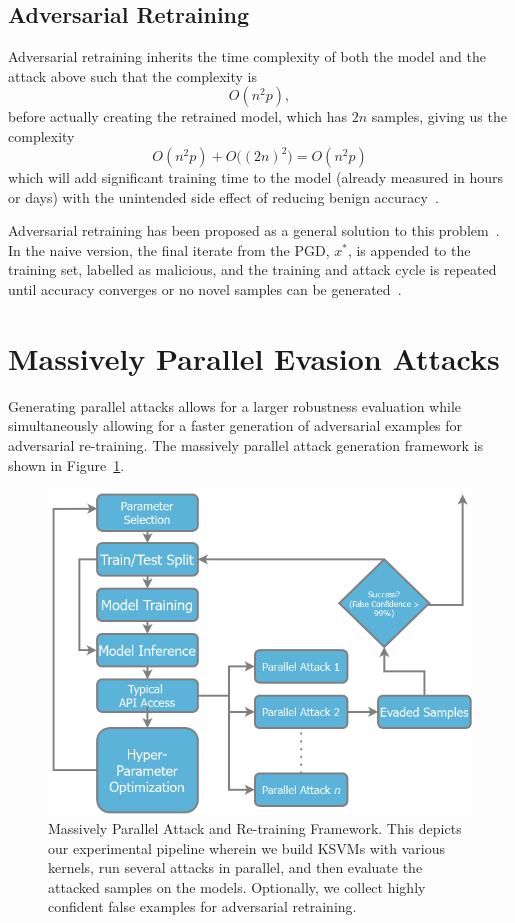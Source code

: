 \documentclass[fonts]{icst}
\begin{document}
\subsection{Adversarial Retraining}
\label{retrain}
Adversarial retraining inherits the time complexity of both the model and the attack above such that the complexity is
$$
    O(n^2p),
$$
before actually creating the retrained model, which has $2n$ samples, giving us the complexity
$$
    O(n^2p) + O\big((2n)^2\big) = O(n^2p)
$$
which will add significant training time to the model (already measured in hours or days) with the unintended side effect of reducing benign accuracy~\cite{stutz2019confidence}.

Adversarial retraining has been proposed as a general solution to this problem~\cite{li2016general,stutz2019confidence}.
In the naive version, the final iterate from the PGD, $x^{*}$, is appended to the training set, labelled as malicious, and the training and attack cycle is repeated until accuracy converges or no novel samples can be generated~\cite{li2016general}.

\section{Massively Parallel Evasion Attacks}


Generating parallel attacks allows for a larger robustness evaluation while simultaneously allowing for a faster generation of adversarial examples for adversarial re-training.
The massively parallel attack generation framework is shown in Figure~\ref{fig:attack_framework}.


\begin{figure}[!htb]
\centering
\includegraphics[width=.7\textwidth]{./ppgd.png}
\caption{Massively Parallel Attack and Re-training Framework.
This depicts our experimental pipeline wherein we build KSVMs with various kernels, run several attacks in parallel, and then evaluate the attacked samples on the models.
Optionally, we collect highly confident false examples for adversarial retraining.}
\label{fig:attack_framework}

\end{figure}
\end{document}
